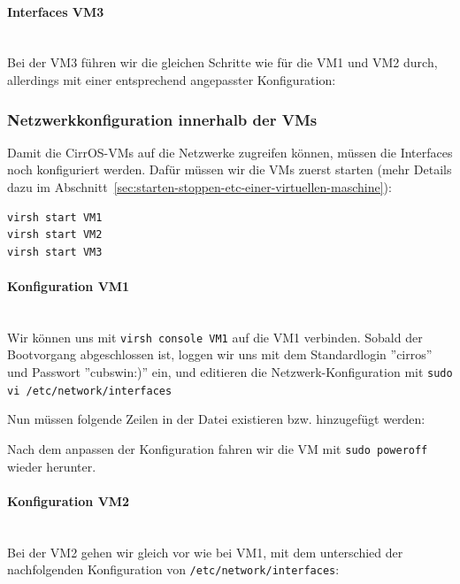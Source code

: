 \paragraph{Interfaces VM3} \hfill \\
Bei der VM3 führen wir die gleichen Schritte wie für die VM1 und VM2 durch, allerdings mit einer entsprechend angepasster Konfiguration:



\subsubsection{Netzwerkkonfiguration innerhalb der VMs}

Damit die CirrOS-VMs auf die Netzwerke zugreifen können, müssen die Interfaces noch konfiguriert werden. Dafür müssen wir die VMs zuerst starten (mehr Details dazu im Abschnitt\nolinebreak\  \ref{sec:starten-stoppen-etc-einer-virtuellen-maschine}):
\begin{lstlisting}
virsh start VM1
virsh start VM2
virsh start VM3
\end{lstlisting}

\paragraph{Konfiguration VM1} \hfill \\
Wir können uns mit \lstinline|virsh console VM1| auf die VM1 verbinden. Sobald der Bootvorgang abgeschlossen ist, loggen wir uns mit dem Standardlogin ''cirros'' und Passwort ''cubswin:)'' ein, und editieren die Netzwerk-Konfiguration mit \lstinline[breaklines=no]|sudo vi /etc/network/interfaces|

Nun müssen folgende Zeilen in der Datei existieren bzw. hinzugefügt werden:



Nach dem anpassen der Konfiguration fahren wir die VM mit \lstinline|sudo poweroff| wieder herunter.

\paragraph{Konfiguration VM2} \hfill \\
Bei der VM2 gehen wir gleich vor wie bei VM1, mit dem unterschied der nachfolgenden Konfiguration von \lstinline|/etc/network/interfaces|:

